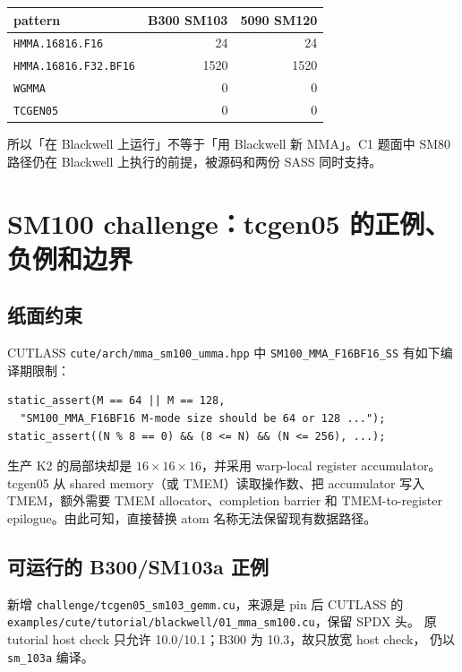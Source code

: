 \documentclass[11pt,a4paper,fontset=none]{ctexart}
\newcommand{\code}[1]{\texttt{#1}}
\begin{document}
\begin{center}\small
\begin{tabular}{@{}lrr@{}}
\toprule
pattern & B300 SM103 & 5090 SM120 \\
\midrule
\code{HMMA.16816.F16} & 24 & 24 \\
\code{HMMA.16816.F32.BF16} & 1520 & 1520 \\
\code{WGMMA} & 0 & 0 \\
\code{TCGEN05} & 0 & 0 \\
\bottomrule
\end{tabular}
\end{center}

所以「在 Blackwell 上运行」不等于「用 Blackwell 新 MMA」。C1 题面中
SM80 路径仍在 Blackwell 上执行的前提，被源码和两份 SASS 同时支持。

\section{SM100 challenge：tcgen05 的正例、负例和边界}

\subsection{纸面约束}

CUTLASS \code{cute/arch/mma\_sm100\_umma.hpp} 中
\code{SM100\_MMA\_F16BF16\_SS} 有如下编译期限制：

\begin{lstlisting}
static_assert(M == 64 || M == 128,
  "SM100_MMA_F16BF16 M-mode size should be 64 or 128 ...");
static_assert((N % 8 == 0) && (8 <= N) && (N <= 256), ...);
\end{lstlisting}

生产 K2 的局部块却是 \(16\times16\times16\)，并采用 warp-local register
accumulator。tcgen05 从 shared memory（或 TMEM）读取操作数、把 accumulator
写入 TMEM，额外需要 TMEM allocator、completion barrier 和 TMEM-to-register
epilogue。由此可知，直接替换 atom 名称无法保留现有数据路径。

\subsection{可运行的 B300/SM103a 正例}

新增 \code{challenge/tcgen05\_sm103\_gemm.cu}，来源是 pin 后 CUTLASS 的
\code{examples/cute/tutorial/blackwell/01\_mma\_sm100.cu}，保留 SPDX 头。
原 tutorial host check 只允许 10.0/10.1；B300 为 10.3，故只放宽 host check，
仍以 \code{sm\_103a} 编译。
\end{document}
